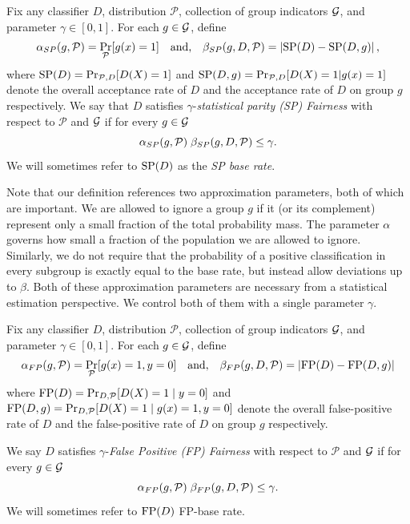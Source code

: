 \begin{definition}
  Fix any classifier $D$, distribution $\mathcal{P}$, collection of
  group indicators $\mathcal{G}$, and parameter $\gamma\in [0, 1]$.
  For each $g\in \mathcal{G}$, define
  \begin{align*}
    \alpha_{SP}(g, \mathcal{P}) = \Pr_{\mathcal{P}}[g(x) = 1] \quad \mbox{and,} \quad
    \beta_{SP}(g, D, \mathcal{P}) = \left|\mathrm{SP}(D) - \mathrm{SP}(D, g)\right|,
  \end{align*}
  where $\mathrm{SP}(D) = \Pr_{\mathcal{P}, D}[D(X) = 1]$ and
  $\mathrm{SP}(D, g) = \Pr_{\mathcal{P}, D}[D(X) = 1 | g(x) = 1]$ denote the overall
  acceptance rate of $D$ and the acceptance rate of $D$ on group $g$
  respectively.  We say that $D$ satisfies $\gamma$-\emph{statistical
    parity (SP) Fairness} with respect to $\mathcal{P}$ and $\mathcal{G}$ if
  for every $g \in \mathcal{G}$
  \[ \alpha_{SP}(g, \mathcal{P}) \; \beta_{SP}(g, D, \mathcal{P})\leq \gamma.\] We will
  sometimes refer to $\mathrm{SP}(D)$ as the \emph{SP base rate}.
\end{definition}

\begin{remark}
  Note that our definition references two approximation parameters,
  both of which are important. We are allowed to ignore a 
  group $g$ if it (or its complement) represent only a small fraction
  of the total probability mass. The parameter $\alpha$ governs how
  small a fraction of the population we are allowed to
  ignore. Similarly, we do not require that the probability of a
  positive classification in every subgroup is exactly equal to the
  base rate, but instead allow deviations up to $\beta$. Both of these
  approximation parameters are necessary from a statistical estimation
  perspective. We control both of them with a single parameter
  $\gamma$.
\end{remark}

\begin{definition}\label{fp-fair}
  Fix any classifier $D$, distribution $\mathcal{P}$, collection of
  group indicators $\mathcal{G}$, and parameter $\gamma \in [0,1]$.  For each
  $g\in \mathcal{G}$, define
  \begin{align*}
    \alpha_{FP}(g, \mathcal{P}) = \Pr_{\mathcal{P}}[g(x) = 1, y=0] \quad \mbox{and,} \quad
                      \beta_{FP}(g, D, \mathcal{P}) = \left| \mathrm{FP}(D) - \mathrm{FP}(D, g) \right|
  \end{align*}
  where $\mathrm{FP}(D) = \Pr_{D, \mathcal{P}} [D(X) = 1\mid y=0]$ and
  $\mathrm{FP}(D, g) = \Pr_{D, \mathcal{P}}[D(X) = 1\mid g(x) =1 , y=0]$ denote the
  overall false-positive rate of $D$ and the false-positive rate of
  $D$ on group $g$ respectively.


  We say $D$
  satisfies $\gamma$-\emph{False Positive (FP) Fairness} with respect
  to $\mathcal{P}$ and $\mathcal{G}$ if for every $g \in \mathcal{G}$
  \[ \alpha_{FP}(g, \mathcal{P}) \; \beta_{FP}(g, D, \mathcal{P}) \leq \gamma.\] We will
  sometimes refer to $\mathrm{FP}(D)$ FP-base rate.%
\end{definition}


